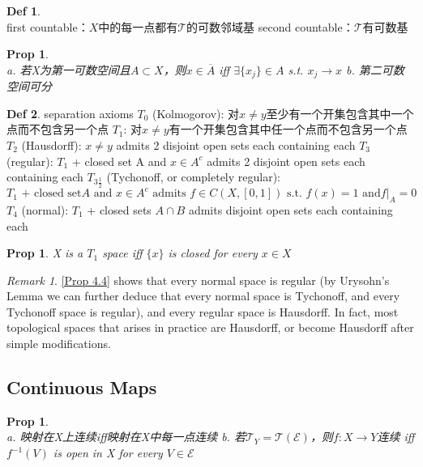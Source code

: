 \documentclass[hidelinks]{article}
\theoremstyle{definition}
\newtheorem*{defin}{Def}
\theoremstyle{plain}
\newtheorem{proposition}[theorem]{Prop}
\theoremstyle{remark}
\newtheorem*{remark}{Remark}
\begin{document}
\begin{defin}~\\
first countable：$X$中的每一点都有$\mathscr{T}$的可数邻域基 \newline
second countable：$\mathscr{T}$有可数基
\end{defin}

\begin{proposition}\label{Prop 4.3}~\\
a. 若X为第一可数空间且$A\subset X$，则$x\in \overline{A}$ \textrm{iff} $\exists\{x_j\}\in A$ \textrm{s.t. }$x_j\to x$ \newline
b. 第二可数空间可分
\end{proposition}

\begin{defin}
separation axioms \newline
$T_0$ (Kolmogorov): 对$x\neq y$至少有一个开集包含其中一个点而不包含另一个点 \newline
$T_1$: 对$x\neq y$有一个开集包含其中任一个点而不包含另一个点 \newline
$T_2$ (Hausdorff): $x\neq y$ admits 2 disjoint open sets each containing each \newline
$T_3$ (regular): $T_1$ + closed set A and $x\in A^c$ admits 2 disjoint open sets each containing each \newline
$T_{3\frac{1}{2}}$ (Tychonoff, or completely regular):
$$
T_1\textrm{ + closed set} A\textrm{ and } x\in A^c \textrm{ admits } f\in C(X,[0,1]) \textrm{ s.t. } f(x)=1 \textrm{ and} \left.f\right|_A=0
$$
$T_4$ (normal): $T_1$ + closed sets $A\cap B$ admits  disjoint open sets each containing each
\end{defin}

\begin{proposition} \label{Prop 4.4}
X is a $T_1$ space iff $\{x\}$ is closed for every $x\in X$
\end{proposition}

\begin{remark}
\autoref{Prop 4.4} shows that every normal space is regular (by Urysohn's Lemma we can further deduce that every normal space is Tychonoff, and every Tychonoff space is regular), and every regular space is Hausdorff. In fact, most topological spaces that arises in practice are Hausdorff, or become Hausdorff after simple modifications.
\end{remark}



\subsection{Continuous Maps}
\begin{proposition}~\\
a. 映射在X上连续iff映射在X中每一点连续 \newline
b. 若$\mathscr{T}_Y=\mathscr{T}(\mathscr{E})$，则$f:X\to Y$连续 iff $f^{-1}(V)$ is open in X for every $V\in \mathscr{E}$
\end{proposition}
\end{document}
